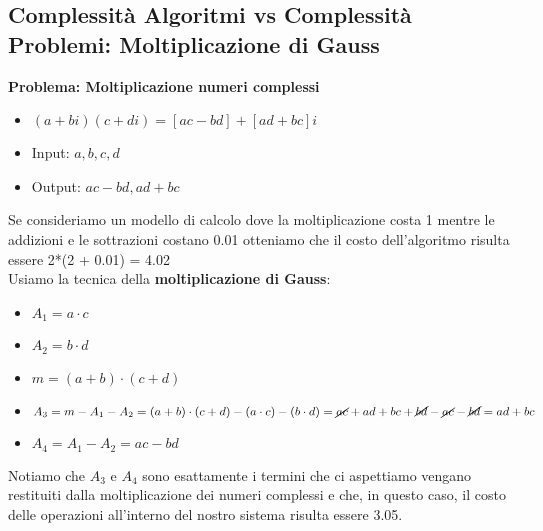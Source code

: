 \documentclass[../cheatSheetAlgoritmi.tex]{subfiles}
\begin{document}
\newpage

\subsection{Complessità Algoritmi vs Complessità Problemi: Moltiplicazione di Gauss}
\textbf{Problema: Moltiplicazione numeri complessi}
\begin{itemize}
	\item $(a + bi)(c + di) = [ac - bd] + [ad + bc]i$
	\item Input: $a, b, c, d$
	\item Output: $ac - bd, ad + bc$
\end{itemize}
Se consideriamo un modello di calcolo dove la moltiplicazione costa 1 mentre le addizioni e le sottrazioni costano 0.01 otteniamo che il costo dell'algoritmo risulta essere 2*(2 + 0.01) = 4.02\\
Usiamo la tecnica della \textbf{moltiplicazione di Gauss}:
\begin{itemize}
	\item $A_1 = a \cdot c$
	\item $A_2 = b \cdot d$
	\item $m = (a + b) \cdot (c + d)$
	\item $A_3 = m - A_1 - A_2 = (a + b) \cdot (c + d) - (a \cdot c) - (b \cdot d) = \cancel{ac} + ad + bc + \cancel{bd} - \cancel{ac} -\cancel{bd} = ad + bc$
	\item $A_4 = A_1 - A_2 = ac - bd$
\end{itemize}
Notiamo che $A_3$ e $A_4$ sono esattamente i termini che ci aspettiamo vengano restituiti dalla moltiplicazione dei numeri complessi e che, in questo caso, il costo delle operazioni all'interno del nostro sistema risulta essere 3.05.
\end{document}
